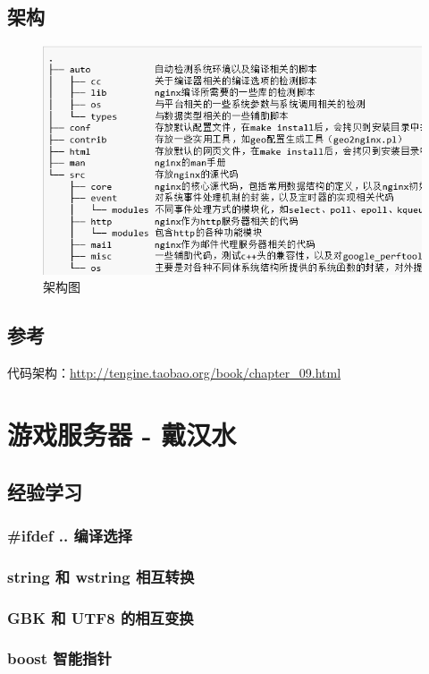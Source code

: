 \documentclass[UTF8,a4paper,8pt]{ctexbook}
\begin{document}
	\section{架构}
		\begin{figure}[h]
			\centering
			\includegraphics[scale = 0.7]{nginx.png}
			\caption{架构图}
		\end{figure}
	\section{参考}
		代码架构：\url{http://tengine.taobao.org/book/chapter_09.html}

\chapter{游戏服务器 - 戴汉水}    
	\section{经验学习}
		 \subsection{\#ifdef .. 编译选择}
		 
		 \subsection{string 和 wstring 相互转换}
		 
		 \subsection{GBK 和 UTF8 的相互变换}
		 
		 \subsection{boost 智能指针}
		 
\end{document}
